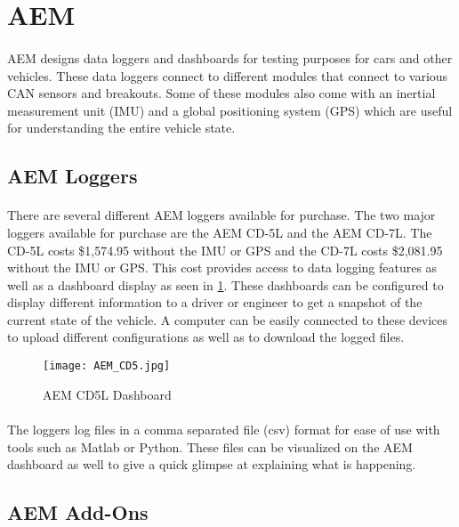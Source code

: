 \section{AEM}

\paragraph{}
AEM \cite{AEMSite} designs data loggers and dashboards for testing purposes for cars and other vehicles.
These data loggers connect to different modules that connect to various CAN sensors and breakouts.
Some of these modules also come with an inertial measurement unit (IMU) and a global positioning system (GPS) which are useful for understanding the entire vehicle state.

\subsection{AEM Loggers}

\paragraph{}
There are several different AEM loggers available for purchase.
The two major loggers available for purchase are the AEM CD-5L and the AEM CD-7L.
The CD-5L costs \$1,574.95 without the IMU or GPS and the CD-7L costs \$2,081.95 without the IMU or GPS.
This cost provides access to data logging features as well as a dashboard display as seen in \cref{fig:AEM_CD5}.
These dashboards can be configured to display different information to a driver or engineer to get a snapshot of the current state of the vehicle.
A computer can be easily connected to these devices to upload different configurations as well as to download the logged files.

\begin{figure}[H]
	\centering
	\texttt{[image: AEM\_CD5.jpg]}
	\caption{AEM CD5L Dashboard}
	\label{fig:AEM_CD5}
\end{figure}

\paragraph{}
The loggers log files in a comma separated file (csv) format for ease of use with tools such as Matlab or Python.
These files can be visualized on the AEM dashboard as well to give a quick glimpse at explaining what is happening.

\subsection{AEM Add-Ons}

